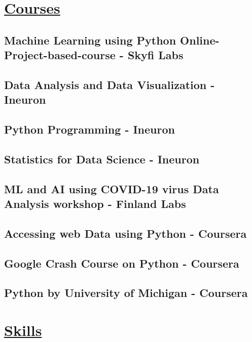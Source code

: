 \documentclass{article}
\begin{document}
\section{\underline{Courses}}


    \subsection{\textbf{Machine Learning using Python Online-Project-based-course }
    \textmd{- Skyfi Labs}}

    \subsection{\textbf{Data Analysis and Data Visualization}
    \textmd{- Ineuron}}

    \subsection{\textbf{Python Programming}
    \textmd{- Ineuron}}
    
    \subsection{\textbf{Statistics for Data Science}
    \textmd{- Ineuron}}

    \subsection{\textbf{ML and AI using COVID-19 virus Data Analysis workshop}
    \textmd{- Finland Labs}}

    \subsection{\textbf{Accessing web Data using Python}
    \textmd{- Coursera}}

    \subsection{\textbf{Google Crash Course on Python}
    \textmd{- Coursera}}

    \subsection{\textbf{Python by University of Michigan}
    \textmd{- Coursera}}
    

 \section{\underline{Skills}}
\end{document}
